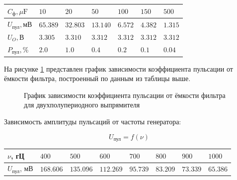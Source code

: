 \documentclass[12pt]{article}
\begin{document}
\begin{table}[H]
\centering
\begin{tabularx}{\textwidth}{|>{\centering\arraybackslash}X|>{\centering\arraybackslash}X|>{\centering\arraybackslash}X|>{\centering\arraybackslash}X|>{\centering\arraybackslash}X|>{\centering\arraybackslash}X|>{\centering\arraybackslash}X|}
\hline
$C_{\text{ф}}, \mu\text{F}$ & $10$ & $20$ & $50$ & $100$ & $150$ & $500$ \\
\hline
$U_{\text{пул}}, \text{мВ}$ & $65.389$ & $32.803$ & $13.140$ & $6.572$ & $4.382$ & $1.315$ \\
\hline
$U_O, \text{В}$ & $3.305$ & $3.310$ & $3.312$ & $3.312$ & $3.312$ & $3.312$ \\
\hline
$P_{\text{пул}}, \%$ & $2.0$ & $1.0$ & $0.4$ & $0.2$ & $0.1$ & $0.04$ \\
\hline
\end{tabularx}
\end{table}

На рисунке \ref{fig:pulse_coefficient_2} представлен график зависимости коэффициента 
пульсации от ёмкости фильтра, построенный по данным из таблицы выше.

\begin{figure}[H]
\centering
{}
\caption{График зависимости коэффициента пульсации от ёмкости фильтра для двухполупериодного выпрямителя}
\label{fig:pulse_coefficient_2}
\end{figure}

Зависимость амплитуды пульсаций от частоты генератора:

$$U_{\text{пул}} = f(\nu)$$

\begin{table}[H]
\centering
\begin{tabularx}{\textwidth}{|>{\centering\arraybackslash}X|>{\centering\arraybackslash}X|>{\centering\arraybackslash}X|>{\centering\arraybackslash}X|>{\centering\arraybackslash}X|>{\centering\arraybackslash}X|>{\centering\arraybackslash}X|>{\centering\arraybackslash}X|}
\hline
$\nu$, гЦ & $400$ & $500$ & $600$ & $700$ & $800$ & $900$ & $1000$ \\
\hline
$U_{\text{пул}}$, мВ & $168.606$ & $135.096$ & $112.269$ & $95.739$ & $83.209$ & $73.339$ & $65.386$ \\
\hline
\end{tabularx}
\end{table}
\end{document}
